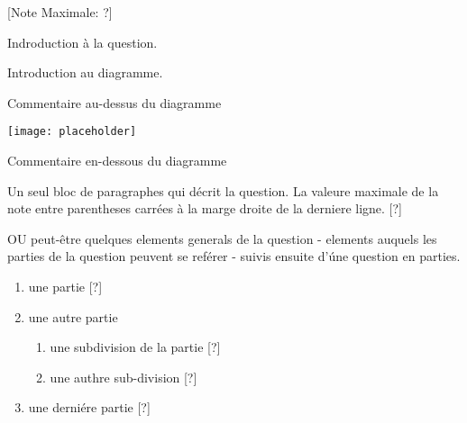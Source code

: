 \begin{question}
  \hspace*{\fill} [Note Maximale: ?]\par
  \medskip
  \noindent Indroduction à la question.\par
  \noindent Introduction au diagramme.\par
  \medskip
  \begin{center} %
    \noindent Commentaire au-dessus du diagramme\par
    \texttt{[image: placeholder]}\par
    \noindent Commentaire en-dessous du diagramme\par
  \end{center} %

  \medskip
  \noindent Un seul bloc de paragraphes qui décrit la question.  La valeure maximale de la note entre parentheses carrées à la marge droite de la derniere ligne.\hspace*{\fill} [?]\par
  
 
  \noindent OU peut-être quelques elements generals de la question - elements auquels les parties de la question peuvent se reférer - suivis ensuite d'úne question en parties.\par
  \begin{enumerate}[label=(\alph*)]
    \item une partie\hspace*{\fill} [?]
    \item une autre partie
      \begin{enumerate}[label=(\roman*)]
        \item une subdivision de la partie\hspace*{\fill} [?] %
        \item une authre sub-division\hspace*{\fill} [?]
      \end{enumerate}
    \item une derniére partie\hspace*{\fill} [?]
  \end{enumerate}
\end{question}
